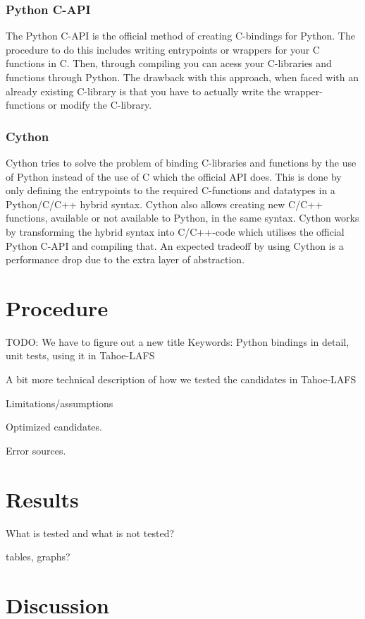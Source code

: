 \documentclass[english,12pt,a4paper]{book}
\begin{document}
\subsection{Python C-API}
The Python C-API is the official method of creating C-bindings for Python. The
procedure to do this includes writing entrypoints or wrappers for your C
functions in C. Then, through compiling you can acess your C-libraries and
functions through Python. The drawback with this approach, when faced with an
already existing C-library is that you have to actually write the
wrapper-functions or modify the C-library.

\subsection{Cython}
Cython tries to solve the problem of binding C-libraries and functions by the
use of Python instead of the use of C which the official API does. This is done
by only defining the entrypoints to the required C-functions and datatypes in a
Python/C/C++ hybrid syntax. Cython also allows creating new C/C++ functions,
available or not available to Python, in the same syntax. Cython works by
transforming the hybrid syntax into C/C++-code which utilises the official
Python C-API and compiling that. An expected tradeoff by using Cython is a
performance drop due to the extra layer of abstraction.


\chapter{Procedure}

TODO: We have to figure out a new title
Keywords: Python bindings in detail, unit tests, using it in Tahoe-LAFS

A bit more technical description of how we tested the candidates in Tahoe-LAFS

Limitations/assumptions

Optimized candidates.

Error sources.


\chapter{Results}

What is tested and what is not tested?

tables, graphs?


\chapter{Discussion}
\end{document}
